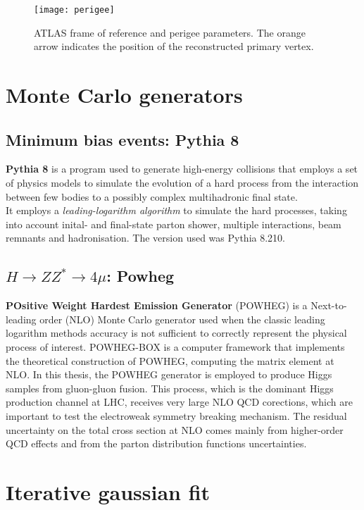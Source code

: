 \documentclass[a4paper,twoside,12pt]{book}
\begin{document}
\begin{appendices}
\begin{figure}
\centering
\texttt{[image: perigee]}
\caption{ATLAS frame of reference and perigee parameters. The orange arrow indicates the position of the reconstructed primary vertex.}
\label{fig:appendix:perigee}
\end{figure}

\chapter{Monte Carlo generators}\label{appendix:MC}
\markboth{\ }{\ }

\section{Minimum bias events: Pythia 8}
\textbf{Pythia 8} is a program used to generate high-energy collisions that employs a set of physics
models to simulate the evolution of a hard process from the interaction between few bodies 
to a possibly complex multihadronic final state\cite{Pythia8}. 	\\
It employs a \textit{leading-logarithm algorithm} to simulate the hard processes, 
taking into account inital- and final-state parton shower, multiple interactions, beam remnants
and hadronisation. The version used was Pythia 8.210.

\section{$H \rightarrow ZZ^* \rightarrow 4\mu$: Powheg}
\textbf{POsitive Weight Hardest Emission Generator} (POWHEG) is a Next-to-leading order (NLO) Monte Carlo generator
used when the classic leading logarithm methods accuracy is not sufficient to correctly 
represent the physical process of interest. POWHEG-BOX is a computer framework 
that implements the theoretical construction of POWHEG, computing the matrix element 
at NLO\cite{Powheg}. In this thesis, the POWHEG generator is employed to produce
Higgs samples from gluon-gluon fusion. This process, which is the dominant Higgs production 
channel at LHC, receives very large NLO QCD corections, which are important to test the 
electroweak symmetry breaking mechanism\cite{Powheg_ggH}. The residual uncertainty 
on the total cross section 
at NLO comes mainly from higher-order QCD effects and from the parton distribution
functions uncertainties.

\chapter{Iterative gaussian fit}\label{appendix:gaussFit}


\end{appendices}
\end{document}
